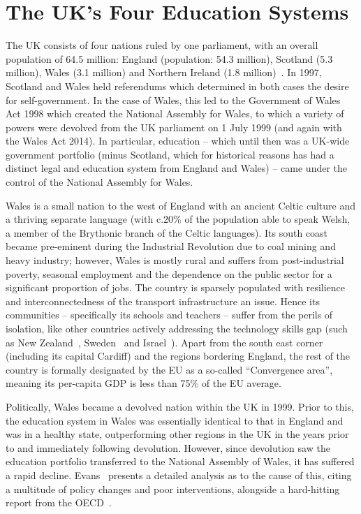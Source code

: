 \documentclass{llncs}
\begin{document}
\section{The UK's Four Education Systems}\label{welshukedu}

The UK consists of four nations ruled by one parliament, with an
overall population of 64.5 million: England (population: 54.3
million), Scotland (5.3 million), Wales (3.1 million) and Northern
Ireland (1.8 million)~\cite{onspop:2016}. In 1997, Scotland and Wales
held referendums which determined in both cases the desire for
self-government.  In the case of Wales, this led to the Government of
Wales Act 1998 which created the National Assembly for Wales, to which
a variety of powers were devolved from the UK parliament on 1 July
1999 (and again with the Wales Act 2014).  In particular, education --
which until then was a UK-wide government portfolio (minus Scotland,
which for historical reasons has had a distinct legal and education
system from England and Wales) -- came under the control of the
National Assembly for Wales.

Wales is a small nation to the west of England with an ancient Celtic
culture and a thriving separate language (with c.20\% of the
population able to speak Welsh, a member of the Brythonic branch of
the Celtic languages).  Its south coast became pre-eminent during the
Industrial Revolution due to coal mining and heavy industry; however,
Wales is mostly rural and suffers from post-industrial poverty,
seasonal employment and the dependence on the public sector for a
significant proportion of jobs. The country is sparsely populated with
resilience and interconnectedness of the transport infrastructure an
issue.  Hence its communities -- specifically its schools and teachers
-- suffer from the perils of isolation, like other countries actively
addressing the technology skills gap (such as New
Zealand~\cite{bell-et-al:2014}, Sweden~\cite{rolandsson+skogh:2014}
and Israel~\cite{gal-ezer+stephenson:2014}). Apart from the south east
corner (including its capital Cardiff) and the regions bordering
England, the rest of the country is formally designated by the EU as a
so-called ``Convergence area'', meaning its per-capita GDP is less
than 75\% of the EU average.

Politically, Wales became a devolved nation within the UK in 1999.
Prior to this, the education system in Wales was essentially
identical to that in England and was in a healthy state, outperforming
other regions in the UK in the years prior to and immediately
following devolution.  However, since devolution saw the education
portfolio transferred to the National Assembly of Wales, it has
suffered a rapid decline. Evans~\cite{Evans:2015} presents a
detailed analysis as to the cause of this, citing a multitude of
policy changes and poor interventions, alongside a hard-hitting report
from the OECD~\cite{oecdwales:2014}.
\end{document}
